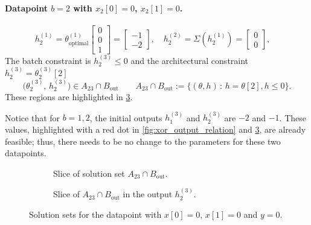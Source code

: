 \paragraph{Datapoint $b=2$ with $x_2[0]=0$, $x_2[1]=0$.}
\[
    h_2^{(1)} = \theta^{(1)}_{\mathrm{optimal}} \begin{bmatrix} 0 \\ 0 \\ 1 \end{bmatrix} = \begin{bmatrix} -1 \\ -2 \end{bmatrix},\quad
    h_2^{(2)} = \Sigma\left( h_2^{(1)} \right) =  \begin{bmatrix} 0 \\ 0 \end{bmatrix},\quad
\]
The batch constraint is $h_2^{(3)}\le 0$ and the architectural constraint 
$h_2^{(3)}=\theta_2^{(3)}[2]$ 
\begin{equation*}
  \bigl(\theta_2^{(3)},\, h_2^{(3)}\bigr) \in A_{23}  \cap B_{\mathrm{out}} \qquad
  A_{23}  \cap B_{\mathrm{out}} := \bigl\{(\theta,h) \,:\, h = \theta[2], h \le 0\bigr\}.
\end{equation*}
These regions are highlighted in \cref{fig:xor_output_relation_wb_only}.
\begin{tcolorbox}
Notice that for $b=1, 2$, the initial outputs $h_1^{(3)}$ and $h_2^{(3)}$ are $-2$ and $-1$. These values, highlighted with a red dot in \cref{fig:xor_output_relation} and \cref{fig:xor_output_relation_wb_only}, are already feasible; thus, there needs to be no change to the parameters for these two datapoints.
\end{tcolorbox}
\begin{figure}[ht]
\centering
\begin{subfigure}[t]{0.48\textwidth}
\centering

\caption{Slice of solution set $A_{23}\cap B_{\mathrm{out}}$.}
\label{fig:xor_constraints_wb_only}
\end{subfigure}
\hfill
\begin{subfigure}[t]{0.48\textwidth}
\centering

\caption{Slice of $A_{23}  \cap B_{\mathrm{out}}$ in the output $h_2^{(3)}$.}
\label{fig:xor_accepted_wb_neg_label}
\end{subfigure}
\caption{Solution sets for the datapoint with $x[0] = 0$, $x[1] = 0$ and $y = 0$.}
\label{fig:xor_output_relation_wb_only}

\end{figure}
\newpage
